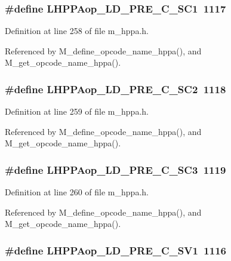 \subsubsection{\setlength{\rightskip}{0pt plus 5cm}\#define LHPPAop\_\-LD\_\-PRE\_\-C\_\-SC1~1117}\label{m__hppa_8h_88c78918f3de9ab4dde1b87dc08962d2}




Definition at line 258 of file m\_\-hppa.h.

Referenced by M\_\-define\_\-opcode\_\-name\_\-hppa(), and M\_\-get\_\-opcode\_\-name\_\-hppa().
\subsubsection{\setlength{\rightskip}{0pt plus 5cm}\#define LHPPAop\_\-LD\_\-PRE\_\-C\_\-SC2~1118}\label{m__hppa_8h_9b0cadd72b7e6720714bae54c23d21f3}




Definition at line 259 of file m\_\-hppa.h.

Referenced by M\_\-define\_\-opcode\_\-name\_\-hppa(), and M\_\-get\_\-opcode\_\-name\_\-hppa().
\subsubsection{\setlength{\rightskip}{0pt plus 5cm}\#define LHPPAop\_\-LD\_\-PRE\_\-C\_\-SC3~1119}\label{m__hppa_8h_2827edf6a9692194230a7ae4eafb926e}




Definition at line 260 of file m\_\-hppa.h.

Referenced by M\_\-define\_\-opcode\_\-name\_\-hppa(), and M\_\-get\_\-opcode\_\-name\_\-hppa().
\subsubsection{\setlength{\rightskip}{0pt plus 5cm}\#define LHPPAop\_\-LD\_\-PRE\_\-C\_\-SV1~1116}\label{m__hppa_8h_2a89374ab6d4ce3815e53045b8180689}




